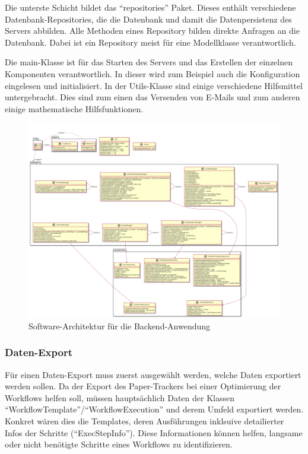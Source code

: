 Die unterste Schicht bildet das \enquote{repositories} Paket.
Dieses enthält verschiedene Datenbank-Repositories, die die Datenbank und damit die Datenpersistenz des Servers abbilden.
Alle Methoden eines Repository bilden direkte Anfragen an die Datenbank.
Dabei ist ein Repository meist für eine Modellklasse verantwortlich.

Die main-Klasse ist für das Starten des Servers und das Erstellen der einzelnen Komponenten verantwortlich.
In dieser wird zum Beispiel auch die Konfiguration eingelesen und initialisiert.
In der Utils-Klasse sind einige verschiedene Hilfsmittel untergebracht.
Dies sind zum einen das Versenden von E-Mails und zum anderen einige mathematische Hilfsfunktionen.

\begin{figure}
	\includegraphics[width=.9\textheight]{images/server_architecture.png}
	\caption{Software-Architektur für die Backend-Anwendung}
	\label{fig:software-architecture}
\end{figure}

\subsubsection{Daten-Export}

Für einen Daten-Export muss zuerst ausgewählt werden, welche Daten exportiert werden sollen.
Da der Export des Paper-Trackers bei einer Optimierung der Workflows helfen soll, müssen hauptsächlich Daten der
Klassen \enquote{WorkflowTemplate}/\enquote{WorkflowExecution} und derem Umfeld exportiert werden.
Konkret wären dies die Templates, deren Ausführungen inklsuive detailierter Infos der Schritte (\enquote{ExecStepInfo}).
Diese Informationen können helfen, langsame oder nicht benötigte Schritte eines Workflows zu identifizieren.


